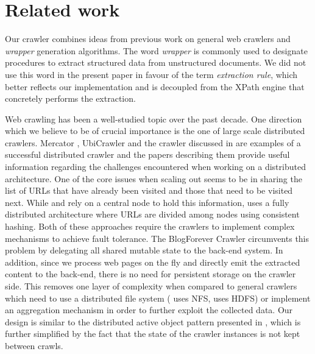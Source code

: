 \section{Related work}
\label{relatedwork}

Our crawler combines ideas from previous work on general web crawlers and \emph{wrapper} generation algorithms. The word \emph{wrapper} is commonly used to designate procedures to extract structured data from unstructured documents. We did not use this word in the present paper in favour of the term \emph{extraction rule}, which better reflects our implementation and is decoupled from the XPath engine that concretely performs the extraction.

Web crawling has been a well-studied topic over the past decade. One direction which we believe to be of crucial importance is the one of large scale distributed crawlers. Mercator \cite{heydon99mercator}, UbiCrawler \cite{boldi2003} and the crawler discussed in \cite{shkapenyuk2002} are examples of a successful distributed crawler and the papers describing them provide useful information regarding the challenges encountered when working on a distributed architecture. One of the core issues when scaling out seems to be in sharing the list of URLs that have already been visited and those that need to be visited next. While \cite{heydon99mercator} and \cite{shkapenyuk2002} rely on a central node to hold this information, \cite{boldi2003} uses a fully distributed architecture where URLs are divided among nodes using consistent hashing. Both of these approaches require the crawlers to implement complex mechanisms to achieve fault tolerance. The BlogForever Crawler circumvents this problem by delegating all shared mutable state to the back-end system. In addition, since we process web pages on the fly and directly emit the extracted content to the back-end, there is no need for persistent storage on the crawler side. This removes one layer of complexity when compared to general crawlers which need to use a distributed file system (\cite{shkapenyuk2002} uses NFS, \cite{berger2011} uses HDFS) or implement an aggregation mechanism in order to further exploit the collected data. Our design is similar to the distributed active object pattern presented in \cite{activeobject1996}, 
which is further simplified by the fact that the state of the crawler instances is not kept between crawls.

